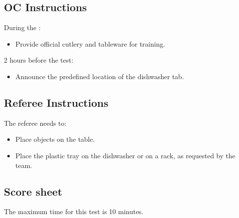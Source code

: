 \subsection*{OC Instructions}

During the \SetupDays:
\begin{itemize}
	\item Provide official cutlery and tableware for training.
\end{itemize}
2 hours before the test:
\begin{itemize}
	\item Announce the predefined location of the dishwasher tab.
\end{itemize}


\subsection*{Referee Instructions}

The referee needs to:
\begin{itemize}
	\item Place objects on the table.
	\item Place the plastic tray on the dishwasher or on a rack, as requested by the team.
\end{itemize}

\subsection*{Score sheet}
The maximum time for this test is 10 minutes.

\begin{scorelist}



\end{scorelist}
\clearpage
